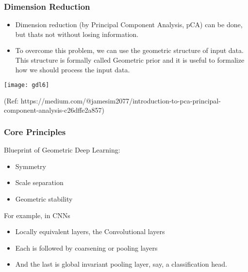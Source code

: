 \begin{frame}[fragile]\frametitle{Dimension Reduction}

\begin{itemize}
\item Dimension reduction (by Principal Component Analysis, pCA) can be done, but thats not without losing information.
\item To overcome this problem, we can use the geometric structure of input data. This structure is formally called Geometric prior and it is useful to formalize how we should process the input data.
\end{itemize}
	  
\begin{center}
\texttt{[image: gdl6]}
\end{center}

{\tiny (Ref: https://medium.com/@jamesim2077/introduction-to-pca-principal-component-analysis-c26dffe2a857)}		
\end{frame}

\begin{frame}[fragile]\frametitle{Core Principles}
Blueprint of Geometric Deep Learning:
\begin{itemize}
\item Symmetry
\item Scale separation
\item Geometric stability
\end{itemize}

For example, in CNNs
\begin{itemize}
\item Locally equivalent layers, the Convolutional layers
\item Each is followed by coarsening or pooling layers
\item And the last is global invariant pooling layer, say, a classification head.
\end{itemize}
	
\end{frame}


